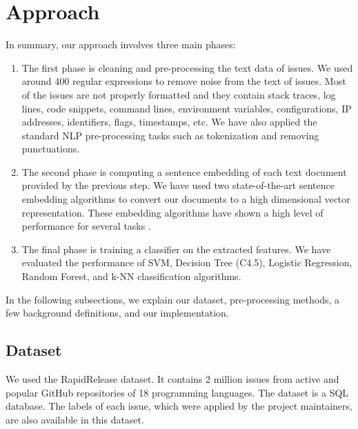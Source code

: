 \documentclass[conference]{IEEEtran}
\begin{document}
\section{Approach}\label{approach}
In summary, our approach involves three main phases:
\begin{enumerate}
  \item The first phase is cleaning and pre-processing the text data of issues. 
  We used around 400 regular expressions to remove noise from the text of issues. 
  Most of the issues are not properly formatted and they contain stack traces, log lines, code snippets, 
  command lines, environment variables, configurations, IP addresses, identifiers, flags, timestamps, etc.
  We have also applied the standard NLP pre-processing tasks such as tokenization and removing punctuations.
  \item The second phase is computing a sentence embedding of each text document provided by 
  the previous step. We have used two state-of-the-art sentence embedding algorithms to convert our
  documents to a high dimensional vector representation. These embedding algorithms have shown a high 
  level of performance for several tasks \cite{reimers-2019-sentence-bert}.
  \item The final phase is training a classifier on the extracted features. We have evaluated
  the performance of SVM, Decision Tree (C4.5), Logistic Regression, Random Forest, and k-NN 
  classification algorithms.
\end{enumerate}

In the following subsections, we explain our dataset, pre-processing methods, a few background definitions, and
our implementation.

\subsection{Dataset}
We used the RapidRelease \cite{8816794} dataset. It contains 2 million issues from active and popular 
GitHub repositories of 18 programming languages. The dataset is a SQL database.
The labels of each issue, which were applied by the project maintainers, are also available in this dataset.
\end{document}
